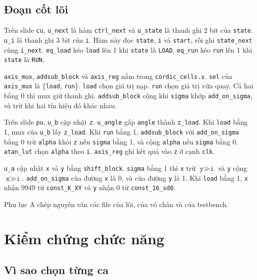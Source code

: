 \documentclass[12pt,a4paper]{article}
\begin{document}
\subsection{Đoạn cốt lõi}

Trên slide \texttt{cu}, \texttt{u\_next} là hàm \texttt{ctrl\_next} và \texttt{u\_state} là thanh ghi 2 bit của \texttt{state}. \texttt{u\_i} là thanh ghi 3 bit của \texttt{i}. Hàm này đọc \texttt{state}, \texttt{i} và \texttt{start}, rồi ghi \texttt{state\_next} cùng \texttt{i\_next}. \texttt{eq\_load} kéo \texttt{load} lên 1 khi \texttt{state} là \texttt{LOAD}. \texttt{eq\_run} kéo \texttt{run} lên 1 khi \texttt{state} là \texttt{RUN}.

\texttt{axis\_mux}, \texttt{addsub\_block} và \texttt{axis\_reg} nằm trong \texttt{cordic\_cells.v}. \texttt{sel} của \texttt{axis\_mux} là \{\texttt{load}, \texttt{run}\}. \texttt{load} chọn giá trị nạp. \texttt{run} chọn giá trị vừa quay. Cả hai bằng 0 thì mux giữ thanh ghi. \texttt{addsub\_block} cộng khi \texttt{sigma} khớp \texttt{add\_on\_sigma}, và trừ khi hai tín hiệu đó khác nhau.

Trên slide \texttt{pu}, \texttt{u\_b} cập nhật \texttt{z}. \texttt{u\_angle} gấp \texttt{angle} thành \texttt{z\_load}. Khi \texttt{load} bằng 1, mux của \texttt{u\_b} lấy \texttt{z\_load}. Khi \texttt{run} bằng 1, \texttt{addsub\_block} với \texttt{add\_on\_sigma} bằng 0 trừ \texttt{alpha} khỏi \texttt{z} nếu \texttt{sigma} bằng 1, và cộng \texttt{alpha} nếu \texttt{sigma} bằng 0. \texttt{atan\_lut} chọn \texttt{alpha} theo \texttt{i}. \texttt{axis\_reg} ghi kết quả vào \texttt{z} ở cạnh \texttt{clk}.

\texttt{u\_a} cập nhật \texttt{x} và \texttt{y} bằng \texttt{shift\_block}. \texttt{sigma} bằng 1 thì \texttt{x} trừ \(\texttt{y} \gg \texttt{i}\) và \texttt{y} cộng \(\texttt{x} \gg \texttt{i}\). \texttt{add\_on\_sigma} của đường \texttt{x} là 0, và của đường \texttt{y} là 1. Khi \texttt{load} bằng 1, \texttt{x} nhận 9949 từ \texttt{const\_K\_XY} và \texttt{y} nhận 0 từ \texttt{const\_16\_sd0}.

Phụ lục A chép nguyên văn các file của lõi, của vỏ chân và của testbench.

\section{Kiểm chứng chức năng}

\subsection{Vì sao chọn từng ca}
\end{document}
